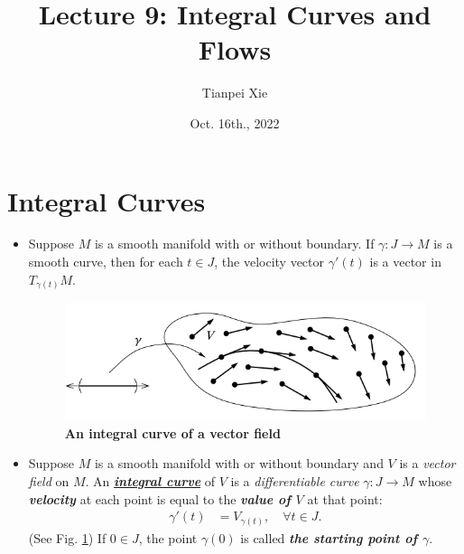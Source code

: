 \documentclass[11pt]{article}
\begin{document}
\title{Lecture 9: Integral Curves and Flows}
\author{ Tianpei Xie}
\date{Oct. 16th., 2022}
\maketitle
\tableofcontents
\newpage
\section{Integral Curves}
\begin{itemize}
\item  Suppose $M$ is a smooth manifold with or without boundary. If $\gamma: J \rightarrow M$ is a smooth curve, then for each $t \in J$, the velocity vector $\gamma'(t)$ is a vector in $T_{\gamma(t)}M$.

\begin{figure}
\begin{minipage}[htb]{1\linewidth}
  \centering
  \centerline{\includegraphics[scale = 0.5]{integral_curves.png}}
\end{minipage}
\caption{\footnotesize{\textbf{An integral curve of a vector field \citep{lee2003introduction}}}}
\label{fig: integral_curves}
\end{figure}

\item \begin{definition}
 Suppose $M$ is a smooth manifold with or without boundary and $V$ is a \emph{vector field} on $M$.  An \underline{\emph{\textbf{integral curve}}} of $V$ is a \emph{differentiable curve} $\gamma: J \rightarrow M$ whose \emph{\textbf{velocity}} at each point is equal to the \emph{\textbf{value of $V$}} at that point:
 \begin{align*}
 \gamma'(t) &= V_{\gamma(t)}, \quad \forall t\in J.
 \end{align*} (See Fig. \ref{fig: integral_curves}) If $0 \in J$, the point $\gamma(0)$ is called \emph{\textbf{the starting point of $\gamma$}}.
\end{definition}





\end{itemize}
\end{document}

